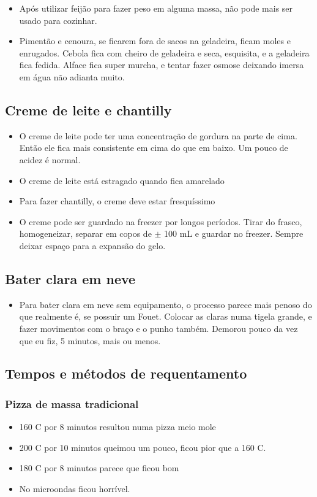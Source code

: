 \begin{itemize}
	\item Após utilizar feijão para fazer peso em alguma massa, não pode mais ser usado para cozinhar.
	\item Pimentão e cenoura, se ficarem fora de sacos na geladeira, ficam moles e enrugados. Cebola fica com
	      cheiro de geladeira e seca, esquisita, e a geladeira fica fedida. Alface fica super murcha, e tentar fazer
	      osmose deixando imersa em água não adianta muito.
\end{itemize}

\subsection*{Creme de leite e chantilly}
\begin{itemize}
	\item O creme de leite pode ter uma concentração de gordura na parte de cima. Então ele fica mais
	      consistente em cima do que em baixo. Um pouco de acidez é normal.
	\item O creme de leite está estragado quando fica amarelado
	\item Para fazer chantilly, o creme deve estar fresquíssimo
	\item O creme pode ser guardado na freezer por longos períodos. Tirar do frasco, homogeneizar, separar em
	      copos de $\pm$ 100 mL e guardar no freezer. Sempre deixar espaço para a expansão do gelo.
\end{itemize}

\subsection*{Bater clara em neve}
\begin{itemize}
	\item Para bater clara em neve sem equipamento, o processo parece mais penoso do que realmente é, se possuir
	      um Fouet. Colocar as claras numa tigela grande, e fazer movimentos com o braço e o punho também. Demorou
	      pouco da vez que eu fiz, 5 minutos, mais ou menos.
\end{itemize}




\subsection*{Tempos e métodos de requentamento}

\subsubsection*{Pizza de massa tradicional}
\begin{itemize}
	\item 160 \grau C por 8 minutos resultou numa pizza meio mole
	\item 200 \grau C por 10 minutos queimou um pouco, ficou pior que a 160 \grau C.
	\item 180 \grau C por 8 minutos parece que ficou bom
	\item No microondas ficou horrível.
\end{itemize}

